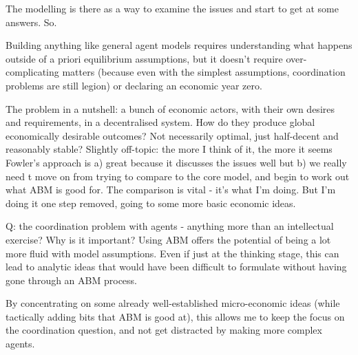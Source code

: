 The modelling is there as a way to examine the issues and start to get at some answers. So.

Building anything like general agent models requires understanding what happens outside of a priori equilibrium assumptions, but it doesn't require over-complicating matters (because even with the simplest assumptions, coordination problems are still legion) or declaring an economic year zero. 

The problem in a nutshell: a bunch of economic actors, with their own desires and requirements, in a decentralised system. How do they produce global economically desirable outcomes? Not necessarily optimal, just half-decent and reasonably stable?
Slightly off-topic: the more I think of it, the more it seems Fowler's approach is a) great because it discusses the issues well but b) we really need t move on from trying to compare to the core model, and begin to work out what ABM is good for. The comparison is vital - it's what I'm doing. But I'm doing it one step removed, going to some more basic economic ideas. 



Q: the coordination problem with agents - anything more than an intellectual exercise? Why is it important? Using ABM offers the potential of being a lot more fluid with model assumptions. Even if just at the thinking stage, this can lead to analytic ideas that would have been difficult to formulate without having gone through an ABM process. 

By concentrating on some already well-established micro-economic ideas (while tactically adding bits that ABM is good at), this allows me to keep the focus on the coordination question, and not get distracted by making more complex agents. 


